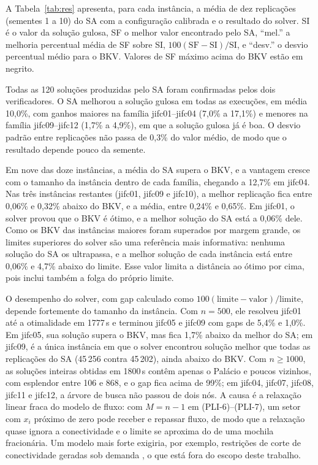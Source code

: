 \documentclass[11pt,a4paper]{article}
\begin{document}
A Tabela~\ref{tab:res} apresenta, para cada instância, a média de dez
replicações (sementes 1 a 10) do SA com a configuração calibrada e o resultado
do solver. SI é o valor da solução gulosa, SF o melhor valor encontrado pelo
SA, ``mel.'' a melhoria percentual média de SF sobre SI,
$100(\mathrm{SF}-\mathrm{SI})/\mathrm{SI}$, e ``desv.'' o desvio percentual
médio para o BKV. Valores de SF máximo acima do BKV estão em negrito.

\begin{table}[htbp]
  \centering
  \footnotesize
  \setlength{\tabcolsep}{3.5pt}
  \caption{Resultados do SA (configuração calibrada) e do HiGHS.}
  \label{tab:res}
  
\end{table}

Todas as 120 soluções produzidas pelo SA foram confirmadas pelos dois
verificadores. O SA melhorou a solução gulosa em todas as execuções, em média
10{,}0\%, com ganhos maiores na família jifc01--jifc04 (7{,}0\% a 17{,}1\%) e
menores na família jifc09--jifc12 (1{,}7\% a 4{,}9\%), em que a solução
gulosa já é boa. O desvio padrão entre replicações não passa de 0{,}3\% do
valor médio, de modo que o resultado depende pouco da semente.

Em nove das doze instâncias, a média do SA supera o BKV, e a vantagem cresce
com o tamanho da instância dentro de cada família, chegando a 12{,}7\% em
jifc04. Nas três instâncias restantes (jifc01, jifc09 e jifc10), a melhor
replicação fica entre 0{,}06\% e 0{,}32\% abaixo do BKV, e a média, entre
0{,}24\% e 0{,}65\%. Em jifc01, o solver provou que o BKV é ótimo, e a melhor
solução do SA está a 0{,}06\% dele. Como os BKV das instâncias maiores foram
superados por margem grande, os limites superiores do solver são uma
referência mais informativa: nenhuma solução do SA os ultrapassa, e a melhor
solução de cada instância está entre 0{,}06\% e 4{,}7\% abaixo do limite.
Esse valor limita a distância ao ótimo por cima, pois inclui também a folga
do próprio limite.

O desempenho do solver, com gap calculado como
$100(\text{limite}-\text{valor})/\text{limite}$, depende fortemente do
tamanho da instância. Com $n=500$, ele resolveu jifc01 até a otimalidade em
1777\,s e terminou jifc05 e jifc09 com gaps de 5{,}4\% e 1{,}0\%. Em jifc05,
sua solução supera o BKV, mas fica 1{,}7\% abaixo da melhor do SA; em jifc09,
é a única instância em que o solver encontrou solução melhor que todas as
replicações do SA (45\,256 contra 45\,202), ainda abaixo do BKV. Com
$n\ge1000$, as soluções inteiras obtidas em 1800\,s contêm apenas o Palácio e
poucos vizinhos, com esplendor entre 106 e 868, e o gap fica acima de 99\%;
em jifc04, jifc07, jifc08, jifc11 e jifc12, a árvore de busca não passou de
dois nós. A causa é a relaxação linear fraca do modelo de fluxo: com
$M=n-1$ em (PLI-6)--(PLI-7), um setor com $x_i$ próximo de zero pode
receber e repassar fluxo, de modo que a relaxação quase ignora a
conectividade e o limite se aproxima do de uma mochila fracionária. Um modelo
mais forte exigiria, por exemplo, restrições de corte de conectividade
geradas sob demanda \citep{MagnantiWolsey1995}, o que está fora do escopo
deste trabalho.
\end{document}
